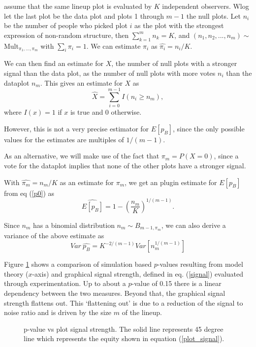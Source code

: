 \documentclass[11pt]{article}
\begin{document}
assume that the same lineup plot is evaluated by $K$ independent observers. Wlog let the last plot be the data plot and plots 1 through $m-1$ the null plots. Let $n_i$ be the number of people who picked plot $i$ as the plot with the strongest expression of non-random structure, then $\sum_{k=1}^{m} n_k = K$, and $(n_1, n_2, ..., n_m) \sim$ Mult$_{\pi_1, ..., \pi_m}$ with $\sum_i \pi_i = 1$. We can estimate $\pi_i$ as $\widehat{\pi_i} = n_i/K$. 

We can then find an estimate for $X$, the number of null plots with a stronger signal than the data plot, as the number of null plots with more votes $n_i$ than the dataplot $n_m$. This gives an estimate for $X$ as
\[
\hat{X} = \sum_{i=0}^{m-1} I(n_i \ge n_m),
\]
where $I(x) = 1$ if $x$ is true and 0 otherwise.

However, this is not a very precise estimator for $E[p_B]$, since the only possible values for the  estimates are multiples of $1/(m-1)$.

As an alternative, we will make use of the fact that $\pi_m = P(X=0)$, since a vote for the dataplot implies that none of the other plots have a stronger signal.

With $\widehat{\pi_m} = n_m/K$ as an estimate for $\pi_m$, we get an plugin estimate for $E[p_B]$ from eq (\ref{p0}) as
\begin{equation}\label{signal}
\widehat{E[p_B]} = 1 - \left( \frac{n_m}{K} \right)^{1/(m-1)}.
\end{equation}

Since $n_m$ has a binomial distribution $n_m \sim B_{m-1, \pi_m}$, we can also derive a variance of the above estimate as
\[
Var \ \widehat{p_B} = K^{-2/(m-1)} Var \left[n_m^{1/(m-1)}\right]
\]

Figure \ref{fig:pval_plot_signal} shows a comparison of simulation based $p$-values resulting from model theory ($x$-axis) and graphical signal strength, defined in eq. (\ref{signal}) evaluated through experimentation.
Up to about a $p$-value of 0.15 there is a linear dependency between the two measures. Beyond that, the graphical signal strength flattens out. This `flattening out' is due to a reduction of the signal to noise ratio and is driven by the size $m$ of the lineup.
\begin{figure}[hbtp]
   \centering
       \caption{p-value vs plot signal strength. The solid line represents 45 degree line which represents the equity shown in equation (\ref{plot_signal}).}
       \label{fig:pval_plot_signal}
\end{figure}
\end{document}
